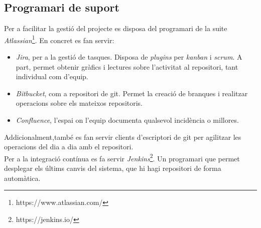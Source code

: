 \subsection{Programari de suport}
\label{metodologia:software_suport}
Per a facilitar la gestió del projecte es disposa del programari de la suite \textit{Atlassian}\footnote{https://www.atlassian.com/}. En concret es fan servir:
\begin{itemize}
    \item \textit{Jira}, per a la gestió de tasques. Disposa de \textit{plugins} per \textit{kanban} i \textit{scrum}. A part, permet obtenir gràfics i lectures sobre l'activitat al repositori, tant individual com d'equip.
    \item \textit{Bitbucket}, com a repositori de git. Permet la creació de branques i realitzar operacions sobre els mateixos repositoris.
    \item \textit{Confluence}, l'espai on l'equip documenta qualsevol incidència o millores.
\end{itemize}
Addicionalment,també es fan servir clients d'escriptori de git per agilitzar les operacions del dia a dia amb el repositori.\\
\newline Per a la integració contínua es fa servir \textit{Jenkins}\footnote{https://jenkins.io/}. Un programari que permet desplegar els últims canvis del sistema, que hi hagi repositori de forma automàtica.
